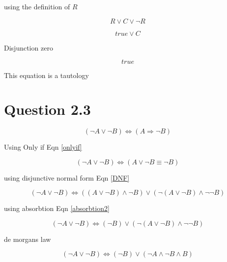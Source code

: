 \documentclass[10pt,a4paper]{article}
\begin{document}
using the definition of $R$

\begin{equation}
 R \vee C \vee \neg R
\end{equation}

\begin{equation}
 true \vee C
\end{equation}

Disjunction zero

\begin{equation}
 true
\end{equation}

This equation is a tautology













\section{Question 2.3}
\begin{equation}
(\neg A \vee \neg B )  \Leftrightarrow (A \Rightarrow \neg B)
\end{equation}

Using Only if Eqn \ref{onlyif}

\begin{equation}
(\neg A \vee \neg B )  \Leftrightarrow (A \vee \neg B \equiv \neg B)
\end{equation}

using disjunctive normal form Eqn \ref{DNF}


\begin{equation}
(\neg A \vee \neg B )  \Leftrightarrow ((A \vee \neg B) \wedge \neg B) \vee (\neg(A\vee \neg B) \wedge \neg\neg B)
\end{equation}

using absorbtion Eqn \ref{absorbtion2}


\begin{equation}
(\neg A \vee \neg B )  \Leftrightarrow ( \neg B) \vee (\neg(A\vee \neg B) \wedge \neg\neg B)
\end{equation}

de morgans law

\begin{equation}
(\neg A \vee \neg B )  \Leftrightarrow ( \neg B) \vee (\neg A \wedge \neg B \wedge B)
\end{equation}
\end{document}
